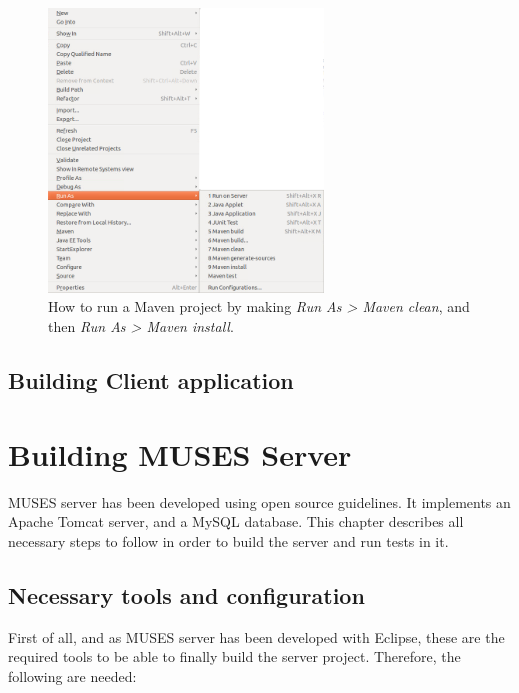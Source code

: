 \begin{figure}
  \begin{center}
    \includegraphics[width=0.65\textwidth]{./Figures/runAs.png}
    \caption{How to run a Maven project by making \textit{Run As > Maven clean}, and then \textit{Run As > Maven install}.}
    \label{fig:RunAs}
  \end{center}
\end{figure}

\section{Building Client application}
\label{sec:buildclient}



\chapter{Building MUSES Server}
\label{ch:server}

MUSES server has been developed using open source guidelines. It implements an Apache Tomcat server, and a MySQL database. This chapter describes all necessary steps to follow in order to build the server and run tests in it.

\section{Necessary tools and configuration}
\label{sec:serverpreliminaries}

First of all, and as MUSES server has been developed with Eclipse, these are the required tools to be able to finally build the server project. Therefore, the following are needed:

